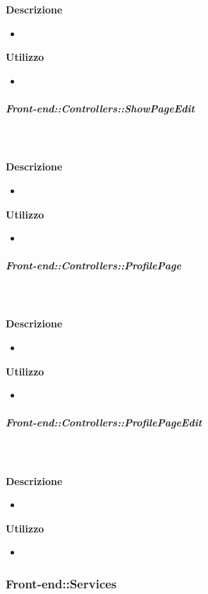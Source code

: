         \textbf{\\ \\ Descrizione} 
          \begin{itemize}
            \item[] 
          \end{itemize}      
        \textbf{Utilizzo}  
          \begin{itemize}
            \item[] 
          \end{itemize}
      \subparagraph{Front-end::Controllers::ShowPageEdit}
        
        \textbf{\\ \\ Descrizione} 
          \begin{itemize}
            \item[] 
          \end{itemize}      
        \textbf{Utilizzo}  
          \begin{itemize}
            \item[] 
          \end{itemize}
      \subparagraph{Front-end::Controllers::ProfilePage}
        
        \textbf{\\ \\ Descrizione} 
          \begin{itemize}
            \item[] 
          \end{itemize}      
        \textbf{Utilizzo}  
          \begin{itemize}
            \item[] 
          \end{itemize}
      \subparagraph{Front-end::Controllers::ProfilePageEdit}
        
        \textbf{\\ \\ Descrizione} 
          \begin{itemize}
            \item[] 
          \end{itemize}      
        \textbf{Utilizzo}  
          \begin{itemize}
            \item[] 
          \end{itemize}
  \subsubsection{Front-end::Services}
